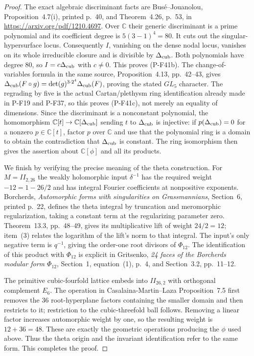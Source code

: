 \begin{proof}
The exact algebraic discriminant facts are
Bus\'e--Jouanolou, Proposition~4.7(i), printed p.~40,
and Theorem~4.26, p.~53, in
\url{https://arxiv.org/pdf/1210.4697}.
Over $\mathbb C$ their generic discriminant is a prime
polynomial and its coefficient degree is
$5(3-1)^4=80$. It cuts out the singular-hypersurface locus.
Consequently $I$, vanishing on the dense nodal locus,
vanishes on its whole irreducible closure and is divisible
by $\Delta_{\rm cub}$. Both polynomials have degree $80$,
so $I=c\Delta_{\rm cub}$ with $c\ne0$.
This proves (P-F41b). The change-of-variables formula in
the same source, Proposition~4.13, pp.~42--43, gives
$\Delta_{\rm cub}(F\circ g)=\det(g)^{3\cdot2^4}
\Delta_{\rm cub}(F)$, proving the stated $GL_5$ character.
The regrading by five is the actual Cartan/plethysm ring
identification already made in P-F19 and P-F37, so this
proves (P-F41c), not merely an equality of dimensions.
Since the discriminant is a nonconstant polynomial,
the homomorphism $\mathbb C[t]\to\mathbb C[\Delta_{\rm cub}]$
sending $t$ to $\Delta_{\rm cub}$ is injective:
if $p(\Delta_{\rm cub})=0$ for a nonzero $p\in\mathbb C[t]$,
factor $p$ over $\mathbb C$ and use that the polynomial
ring is a domain to obtain the contradiction that
$\Delta_{\rm cub}$ is constant.
The ring isomorphism then gives the assertion about
$\mathbb C[\phi]$ and all its products.

We finish by verifying the precise meaning of the theta
construction. For $M=II_{2,26}$ the weakly holomorphic
input $\delta^{-1}$ has the required weight $-12=1-26/2$
and has integral Fourier coefficients at nonpositive
exponents. Borcherds, \emph{Automorphic forms with
singularities on Grassmannians}, Section~6, printed p.~22,
defines the theta integral by truncation and meromorphic
regularization, taking a constant term at the regularizing
parameter zero. Theorem~13.3, pp.~48--49, gives its
multiplicative lift of weight $24/2=12$; item~(3)
relates the logarithm of the lift's norm to that integral.
The input's only negative term is $q^{-1}$, giving the
order-one root divisors of $\Phi_{12}$.
The identification of this product with $\Phi_{12}$ is
explicit in Gritsenko, \emph{24 faces of the Borcherds
modular form $\Phi_{12}$}, Section~1, equation~(1),
p.~4, and Section~3.2, pp.~11--12.

The primitive cubic-fourfold lattice embeds into
$II_{26,2}$ with orthogonal complement $E_6$.
The operation in Casalaina-Martin--Laza Proposition~7.5
first removes the $36$ root-hyperplane factors containing
the smaller domain and then restricts to it; restriction
to the cubic-threefold ball follows. Removing a linear
factor increases automorphic weight by one, so the resulting
weight is $12+36=48$. These are exactly the geometric
operations producing the $\phi$ used above. Thus the
theta origin and the invariant identification refer to
the same form. This completes the proof.
\end{proof}

